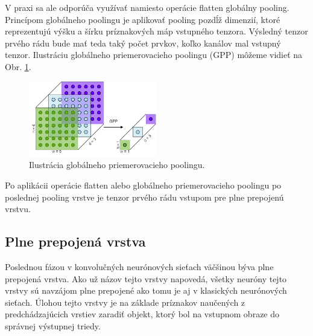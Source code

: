 V praxi sa ale odporúča využívať namiesto operácie flatten globálny pooling. Princípom globálneho poolingu je aplikovať pooling pozdĺž dimenzií, ktoré reprezentujú
výšku a šírku príznakových máp vstupného tenzora. Výsledný tenzor prvého
rádu bude mať teda taký počet prvkov, koľko kanálov mal vstupný tenzor. Ilustráciu
globálneho priemerovacieho poolingu (GPP) môžeme vidieť na Obr. \ref{fig:gap}.

\begin{figure}[H]
  \centerline{\includegraphics[width=0.5\textwidth]{images/gap.drawio.png}}
  \caption{Ilustrácia globálneho priemerovacieho poolingu.}
  \label{fig:gap}
\end{figure}

Po aplikácii operácie flatten alebo globálneho priemerovacieho poolingu po poslednej pooling vrstve je tenzor prvého rádu vstupom pre plne prepojenú vrstvu.

\subsection{Plne prepojená vrstva}

Poslednou fázou v konvolučných neurónových sieťach väčšinou býva plne prepojená
vrstva. Ako už názov tejto vrstvy napovedá, všetky neuróny tejto vrstvy sú navzájom
plne prepojené ako tomu je aj v klasických neurónových sieťach. Úlohou tejto vrstvy je
na základe príznakov naučených z predchádzajúcich vrstiev zaradiť objekt, ktorý bol
na vstupnom obraze do správnej výstupnej triedy.